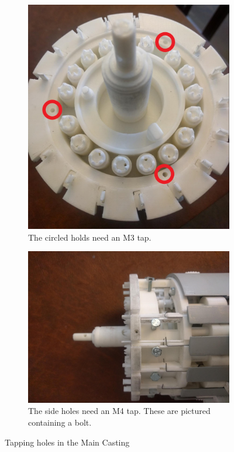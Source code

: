 \documentclass[openany]{book}
\begin{document}
\begin{figure}[!ht]
	\centering
	\begin{subfigure}{.4\textwidth}
		\centering
		\includegraphics[width=.95\textwidth]{images/image45-circles.jpg}
		\caption{The circled holds need an M3 tap.}
		\label{fig:image45}	
	\end{subfigure}
	\begin{subfigure}{.4\textwidth}
		\centering
		\includegraphics[width=.95\textwidth]{images/image11.jpg}
		\caption{The side holes need an M4 tap. These are pictured containing a bolt.}
		\label{fig:image11}	
	\end{subfigure}
	\caption{Tapping holes in the Main Casting}
\end{figure}
\end{document}
